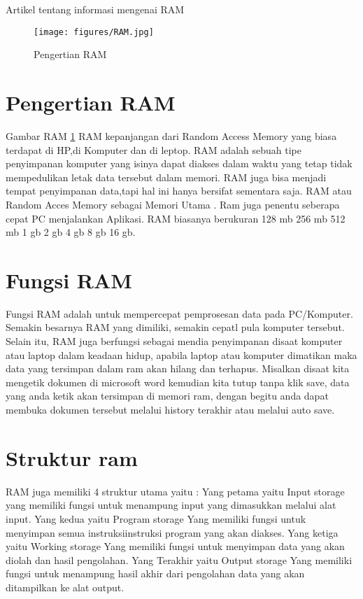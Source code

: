 ﻿%





Artikel tentang informasi mengenai RAM

  \begin{figure}[ht]
  \centerline{\texttt{[image: figures/RAM.jpg]}}
  \caption{Pengertian RAM}
  \label{RAM}
  \end{figure}

\section{Pengertian RAM}
Gambar RAM \ref{RAM}
RAM kepanjangan dari Random Access Memory yang biasa terdapat di HP,di Komputer dan di leptop.
RAM adalah sebuah tipe penyimpanan komputer yang isinya dapat diakses dalam waktu yang tetap tidak mempedulikan letak data tersebut dalam memori.
RAM juga bisa menjadi tempat penyimpanan data,tapi hal ini hanya bersifat sementara saja.
RAM atau Random Acces Memory sebagai Memori Utama . Ram juga penentu seberapa cepat PC menjalankan Aplikasi.
RAM biasanya berukuran 128 mb 256 mb 512 mb 1 gb 2 gb 4 gb 8 gb 16 gb.

\section{Fungsi RAM}
Fungsi RAM adalah untuk mempercepat pemprosesan data pada PC/Komputer. Semakin besarnya RAM yang dimiliki, semakin cepatl pula komputer tersebut.
Selain itu, RAM juga berfungsi sebagai mendia penyimpanan disaat komputer atau laptop dalam keadaan hidup, apabila laptop atau komputer dimatikan maka data yang tersimpan dalam ram akan hilang dan terhapus. Misalkan disaat kita mengetik dokumen di microsoft word kemudian kita tutup tanpa klik save, data yang anda ketik akan tersimpan di memori ram, dengan begitu anda dapat membuka dokumen tersebut melalui history terakhir atau melalui auto save.

\section{Struktur ram}
RAM juga memiliki 4 struktur utama yaitu :
Yang petama yaitu Input storage yang memiliki fungsi untuk menampung input yang dimasukkan melalui alat input.
Yang kedua yaitu Program storage Yang memiliki fungsi untuk menyimpan semua instruksi\-instruksi program yang akan diakses.
Yang ketiga yaitu Working storage Yang memiliki fungsi untuk menyimpan data yang akan diolah dan hasil pengolahan.
Yang Terakhir yaitu Output storage Yang memiliki fungsi untuk menampung hasil akhir dari pengolahan data yang akan ditampilkan ke alat output.

